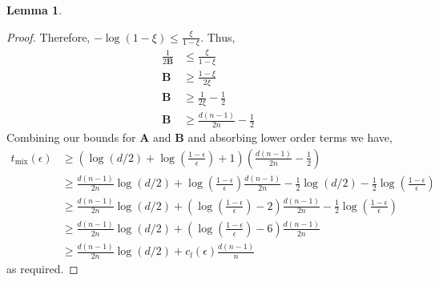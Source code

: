 \documentclass{article}
\theoremstyle{definition}
\theoremstyle{definition}
\theoremstyle{definition}
\newtheorem{lemma}{Lemma}
\theoremstyle{definition}
\theoremstyle{named}
\begin{document}
\begin{lemma}
\begin{proof}
      Therefore, $-\log(1-\xi) \leq \frac{\xi}{1-\xi}$. Thus,
      \begin{align*}
         \frac{1}{2\mathbf{B}} &\leq \frac{\xi}{1-\xi}\\
         \mathbf{B} &\geq \frac{1-\xi}{2\xi}\\
         \mathbf{B} &\geq \frac{1}{2\xi} - \frac{1}{2}\\
         \mathbf{B} &\geq \frac{d(n-1)}{2n} - \frac{1}{2}
      \end{align*}
      Combining our bounds for $\mathbf{A}$ and $\mathbf{B}$ and absorbing lower order terms we have,
      \begin{align*}
         t_\text{mix}(\epsilon) &\geq \left(\log(d/2) + \log\left(\frac{1-\epsilon}{\epsilon}\right)+1\right)\left(\frac{d(n-1)}{2n} - \frac{1}{2}\right)\\
         &\geq \frac{d(n-1)}{2n}\log(d/2) + \log\left(\frac{1-\epsilon}{\epsilon}\right)\frac{d(n-1)}{2n}- \frac{1}{2}\log(d/2) -\frac{1}{2}\log\left(\frac{1-\epsilon}{\epsilon}\right)\\
         &\geq \frac{d(n-1)}{2n}\log(d/2) + \left(\log\left(\frac{1-\epsilon}{\epsilon}\right)-2\right)\frac{d(n-1)}{2n} -\frac{1}{2}\log\left(\frac{1-\epsilon}{\epsilon}\right)\\
         &\geq \frac{d(n-1)}{2n}\log(d/2) + \left(\log\left(\frac{1-\epsilon}{\epsilon}\right)-6\right)\frac{d(n-1)}{2n}\\
         &\geq \frac{d(n-1)}{2n}\log(d/2) + c_l(\epsilon)\frac{d(n-1)}{n}
      \end{align*}
      as required.
   \end{proof}
  \end{lemma}
\end{document}
